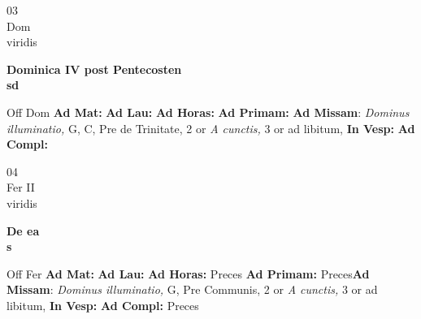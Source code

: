 \documentclass[10pt, openany]{book}
\begin{document}
    \begin{center}
        \begin{minipage}{3.5in}
            \vspace{2em}
            \begin{minipage}{0.5in}
                {\Huge 03} \\
                {\normalsize Dom} \\
                {\normalsize viridis}
            \end{minipage}
            \begin{minipage}{3.0in}
                \textbf{ \large Dominica IV post Pentecosten \\
                \textnormal{\normalsize sd}} \\ 
            \end{minipage}
            \begin{justify}Off Dom
                \textbf{Ad Mat: }
                \textbf{Ad Lau: }
                \textbf{Ad Horas: }
                \textbf{Ad Primam: }\textbf{Ad Missam}: \textit{Dominus illuminatio,} G, C, Pre de Trinitate, 2 or \textit{A cunctis,} 3 or ad libitum,  
                \textbf{In Vesp: }
                \textbf{Ad Compl: }
            \end{justify}
        \end{minipage}
    \end{center}

    \begin{center}
        \begin{minipage}{3.5in}
            \vspace{2em}
            \begin{minipage}{0.5in}
                {\Huge 04} \\
                {\normalsize Fer II} \\
                {\normalsize viridis}
            \end{minipage}
            \begin{minipage}{3.0in}
                \textbf{ \large De ea \\
                \textnormal{\normalsize s}} \\ 
            \end{minipage}
            \begin{justify}Off Fer
                \textbf{Ad Mat: }
                \textbf{Ad Lau: }
                \textbf{Ad Horas: }Preces
                \textbf{Ad Primam: }Preces\textbf{Ad Missam}: \textit{Dominus illuminatio,} G, Pre Communis, 2 or \textit{A cunctis,} 3 or ad libitum,  
                \textbf{In Vesp: }
                \textbf{Ad Compl: }Preces
            \end{justify}
        \end{minipage}
    \end{center}
\end{document}
